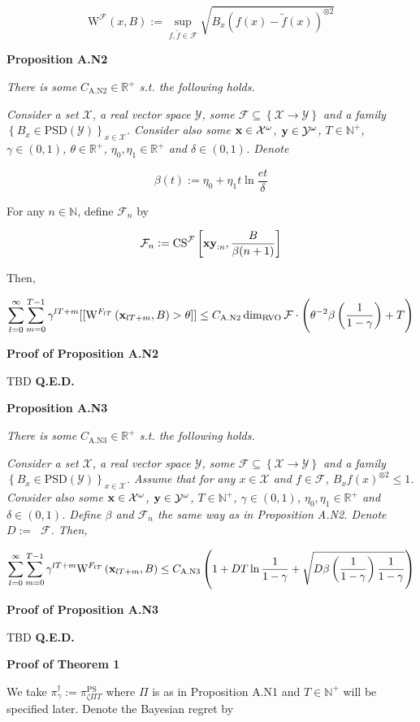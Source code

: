 \documentclass[a4paper]{article}
\newcommand{\Co}[1]{}
\newcommand{\AP}[1]{\left(#1\right)}
\newcommand{\AB}[1]{\left[#1\right]}
\newcommand{\AC}[1]{\left\{#1\right\}}
\newcommand{\Nats}{\mathbb{N}}
\newcommand{\Reals}{\mathbb{R}}
\newcommand{\PSD}{\mathrm{PSD}}
\newcommand{\B}{B}
\newcommand{\X}{\mathcal{X}}
\newcommand{\Y}{\mathcal{Y}}
\newcommand{\F}{\mathcal{F}}
\DeclareMathOperator{\RVO}{\dim_{RVO}}
\newcommand{\PSR}{\text{PS}}
\newcommand{\CS}{\mathrm{CS}}
\newcommand{\W}{\mathrm{W}}
\begin{document}
$$\W^\F(x,B):=\sup_{f,\tilde{f}\in\F}\sqrt{\B _x\AP{f(x)-\tilde{f}(x)}^{\otimes2}}$$  

\textbf{Proposition A.N2}\Co{b}

\textit{There is some $C_{\mathrm{A.N2}}\in\Reals^+$ s.t. the following holds.}\Co{i}

\textit{Consider a set $\X$, a real vector space $\Y$, some $\F\subseteq\AC{\X\rightarrow\Y}$ and a family $\AC{\B _x\in\PSD(\Y)}_{x\in\X}$. Consider also some $\bold{x}\in\X^\omega$, $\bold{y}\in\Y^\omega$, $T\in\Nats^+$, $\gamma\in(0,1)$, $\theta\in\Reals^+$, $\eta_0,\eta_1\in\Reals^+$ and $\delta\in(0,1)$. Denote}\Co{i}

$$\beta(t):=\eta_0 + \eta_1t\ln{\frac{et}{\delta}}$$

For any $n\in\Nats$, define $\F_n$ by

$$\F_n:=\CS^\F\AB{\bold{xy}_{:n},\frac{\B }{\beta(n+1)}}$$

Then,

$$\sum_{l=0}^\infty\sum_{m=0}^{T-1}{\gamma^{lT+m}[[\W^{F_{lT}}\AP{\bold{x}_{lT+m},B}>\theta]]} \leq C_{\mathrm{A.N2}}\RVO{\F}\cdot\AP{\theta^{-2}\beta\AP{\frac{1}{1-\gamma}}+T}$$

\textbf{Proof of Proposition A.N2}\Co{b}

TBD \textbf{Q.E.D.}\Co{b}

\textbf{Proposition A.N3}\Co{b}

\textit{There is some $C_{\mathrm{A.N3}}\in\Reals^+$ s.t. the following holds.}\Co{i}

\textit{Consider a set $\X$, a real vector space $\Y$, some $\F\subseteq\AC{\X\rightarrow\Y}$ and a family $\AC{\B _x\in\PSD(\Y)}_{x\in\X}$. Assume that for any $x\in\X$ and $f\in\F$, $\B _x{f(x)}^{\otimes2}\leq 1$. Consider also some $\bold{x}\in\X^\omega$, $\bold{y}\in\Y^\omega$, $T\in\Nats^+$, $\gamma\in(0,1)$, $\eta_0,\eta_1\in\Reals^+$ and $\delta\in(0,1)$. Define $\beta$ and $\F_n$ the same way as in Proposition A.N2. Denote $D:=\RVO{\F}$. Then,}\Co{i}

$$\sum_{l=0}^\infty\sum_{m=0}^{T-1}{\gamma^{lT+m}\W^{F_{lT}}\AP{\bold{x}_{lT+m},B}} \leq C_{\mathrm{A.N3}}\AP{1+D T\ln\frac{1}{1-\gamma}+\sqrt{D\beta\AP{\frac{1}{1-\gamma}}\frac{1}{1-\gamma}}}$$

\textbf{Proof of Proposition A.N3}\Co{b}

TBD \textbf{Q.E.D.}\Co{b}

\textbf{Proof of Theorem 1}\Co{b}

We take $\pi^\dagger_\gamma:=\pi^\PSR_{\zeta\Pi T}$ where $\Pi$ is as in Proposition A.N1 and $T\in\Nats^+$ will be specified later. Denote the Bayesian regret by
\end{document}
